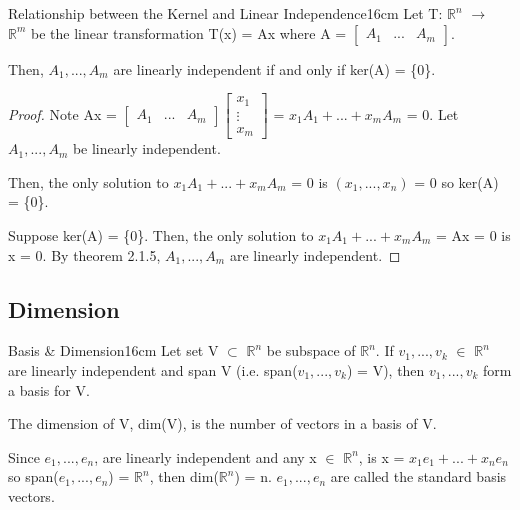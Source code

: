     \newpage



    \begin{wtheorem}{Relationship between the Kernel and Linear Independence}{16cm}
        Let T: $\mathbb{R}^n$ $\rightarrow$ $\mathbb{R}^m$
        be the linear transformation T(x) = Ax where A =
        $\begin{bmatrix}
            A_1 & ... & A_m
        \end{bmatrix}$.

        Then, $A_1,...,A_m$ are linearly independent if and only if
        ker(A) = \{0\}.
    \end{wtheorem}

    \begin{proof}
        Note 
        Ax =
        \footnotesize
        $\begin{bmatrix}
            A_1 & ... & A_m
        \end{bmatrix}
        \begin{bmatrix}
            x_1 \\
            \vdots \\
            x_m
        \end{bmatrix}$
        \normalsize
        = $x_1A_1 + ... + x_mA_m$
        = 0.
        Let $A_1,...,A_m$ be linearly independent.

        Then, the only solution to $x_1A_1 + ... + x_mA_m$ = 0
        is $(x_1,...,x_n)$ = 0 so ker(A) = \{0\}.

        \vspace{0.2cm}

        Suppose ker(A) = \{0\}.
        Then, the only solution
        to $x_1A_1 + ... + x_mA_m$ = Ax = 0 is x = 0.
        By {\color{red} theorem 2.1.5},
        $A_1,...,A_m$ are linearly independent.
    \end{proof}





\subsection{ Dimension }

    \begin{definition}{Basis \& Dimension}{16cm}
        Let set V $\subset$ $\mathbb{R}^n$ be subspace of $\mathbb{R}^n$.
        If $v_1,...,v_k$ $\in$ $\mathbb{R}^n$ are linearly independent and span V
        (i.e. span($v_1,...,v_k$) = V), then $v_1,...,v_k$ form
        a {\color{lblue} basis} for V.

        The {\color{lblue} dimension} of V, dim(V), is the number of vectors in
        a basis of V.

        Since $e_1,...,e_n$, are linearly independent
        and any x $\in$ $\mathbb{R}^n$, is x = $x_1e_1 + ... + x_ne_n$
        so span($e_1,...,e_n$) = $\mathbb{R}^n$, then dim($\mathbb{R}^n$) = n.
        $e_1,...,e_n$ are called the {\color{lblue} standard basis vectors}.
    \end{definition}

